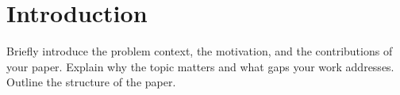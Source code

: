 \section{Introduction}\label{sec1}
Briefly introduce the problem context, the motivation, and the contributions of your paper. Explain why the topic matters and what gaps your work addresses. Outline the structure of the paper.
